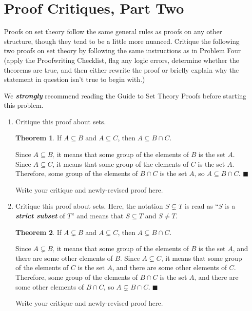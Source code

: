 \documentclass{article}
\renewcommand{\(}{\left(}
\renewcommand{\)}{\right)}
\renewcommand\qedsymbol{$\blacksquare$}
\newenvironment{prf}{{\bfseries Proof.}}{\qedsymbol}
\renewcommand{\emph}[1]{\textit{\textbf{#1}}}
\theoremstyle{plain}
\theoremstyle{plain}
\theoremstyle{definition}
\newtheorem*{thm}{Theorem}
\begin{document}
\section{Proof Critiques, Part Two}

Proofs on set theory follow the same general rules as proofs on any other structure, though they tend to be a little more nuanced. Critique the following two proofs on set theory by following the same instructions as in Problem Four (apply the Proofwriting Checklist, flag any logic errors, determine whether the theorems are true, and then either rewrite the proof or briefly explain why the statement in question isn't true to begin with.)

We \emph{strongly} recommend reading the Guide to Set Theory Proofs before starting this problem.

\begin{enumerate}[label*=\roman*.,ref=\roman*]
    \item Critique this proof about sets.
    \begin{thm}
     If $A \subseteq B$ and $A \subseteq C$, then $A \subseteq B \cap C$. 
    \end{thm}
    \begin{prf}
    Since $A \subseteq B$, it means that some group of the elements of $B$ is the set $A$. Since $A \subseteq C$, it means that some group of the elements of $C$ is the set $A$. Therefore, some group of the elements of $B \cap C$ is the set $A$, so $A \subseteq B \cap C$.
    \end{prf}
    
    \begin{shaded}
    Write your critique and newly-revised proof here.
    \end{shaded}

    \item Critique this proof about sets. Here, the notation $S \subsetneq T$ is read as ``$S$ is a \emph{strict subset} of $T$'' and means that $S \subseteq T$ and $S \neq T$.
    \begin{thm}
     If $A \subsetneq B$ and $A \subsetneq C$, then $A \subsetneq B \cap C$. 
    \end{thm}
    \begin{prf}
    Since $A \subsetneq B$, it means that some group of the elements of $B$ is the set $A$, and there are some other elements of $B$. Since $A \subsetneq C$, it means that some group of the elements of $C$ is the set $A$, and there are some other elements of $C$. Therefore, some group of the elements of $B \cap C$ is the set $A$, and there are some other elements of $B \cap C$, so $A \subsetneq B \cap C$.
    \end{prf}
    
    \begin{shaded}
    Write your critique and newly-revised proof here.
    \end{shaded}

\end{enumerate}
\end{document}

